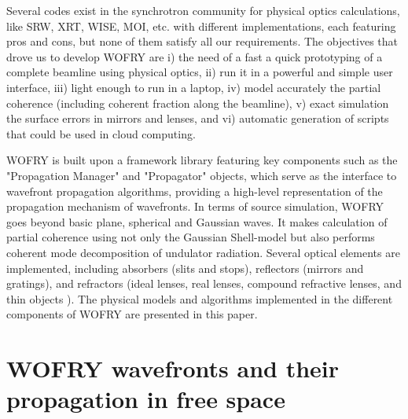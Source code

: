 \documentclass{iopconfser}
\begin{document}
Several codes exist in the synchrotron community for physical optics calculations, like SRW\cite{codeSRW}, XRT\cite{XRT}, WISE\cite{wise}, MOI\cite{MOI}, etc. with different implementations, each featuring pros and cons, but none of them satisfy all our requirements. The objectives that drove us to develop WOFRY are i) the need of a fast a quick prototyping of a complete beamline using physical optics, ii) run it in a powerful and simple user interface, iii) light enough to run in a laptop, iv) model accurately the partial coherence (including coherent fraction along the beamline), v) exact simulation the surface errors in mirrors and lenses, and vi) automatic generation of scripts that could be used in cloud computing.    

WOFRY is built upon a framework library \cite{syned} featuring key components such as the "Propagation Manager" and "Propagator" objects, which serve as the interface to wavefront propagation algorithms, providing a high-level representation of the propagation mechanism of wavefronts.
In terms of source simulation, WOFRY goes beyond basic plane, spherical and Gaussian waves. It makes calculation of partial coherence using not only the Gaussian Shell-model but also performs coherent mode decomposition of undulator radiation\cite{SanchezdelRio2022CMD}.
Several optical elements are implemented, including absorbers (slits and stops), reflectors (mirrors and gratings), and refractors (ideal lenses, real lenses, compound refractive lenses, and thin objects \cite{Celestre2019}).
The physical models and algorithms implemented in the different components of WOFRY are 
presented in this paper. 







\section{WOFRY wavefronts and their propagation in free space}

\end{document}
